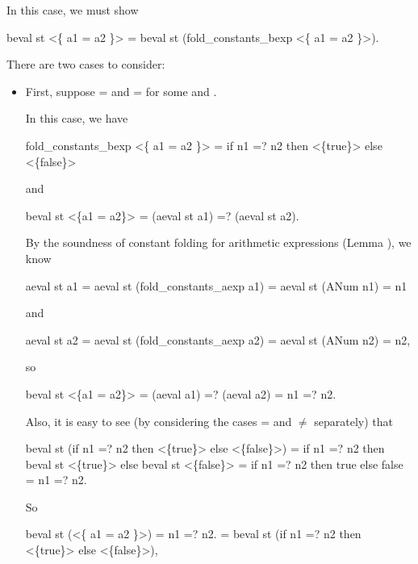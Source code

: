 \documentclass[12pt]{report}
\begin{document}
   In this case, we must show


       beval st <\{ a1 = a2 \}>
     = beval st (fold\_constants\_bexp <\{ a1 = a2 \}>).


   There are two cases to consider:



\begin{itemize}
\item  First, suppose   =   and
         =   for some  and .


       In this case, we have


           fold\_constants\_bexp <\{ a1 = a2 \}>
         = if n1 =? n2 then <\{true\}> else <\{false\}>


       and


           beval st <\{a1 = a2\}>
         = (aeval st a1) =? (aeval st a2).


       By the soundness of constant folding for arithmetic
       expressions (Lemma ), we know


           aeval st a1
         = aeval st (fold\_constants\_aexp a1)
         = aeval st (ANum n1)
         = n1


       and


           aeval st a2
         = aeval st (fold\_constants\_aexp a2)
         = aeval st (ANum n2)
         = n2,


       so


           beval st <\{a1 = a2\}>
         = (aeval a1) =? (aeval a2)
         = n1 =? n2.


       Also, it is easy to see (by considering the cases  =  and
        \ensuremath{\not=}  separately) that


           beval st (if n1 =? n2 then <\{true\}> else <\{false\}>)
         = if n1 =? n2 then beval st <\{true\}> else beval st <\{false\}>
         = if n1 =? n2 then true else false
         = n1 =? n2.


       So


           beval st (<\{ a1 = a2 \}>)
         = n1 =? n2.
         = beval st (if n1 =? n2 then <\{true\}> else <\{false\}>),



\end{itemize}
\end{document}

